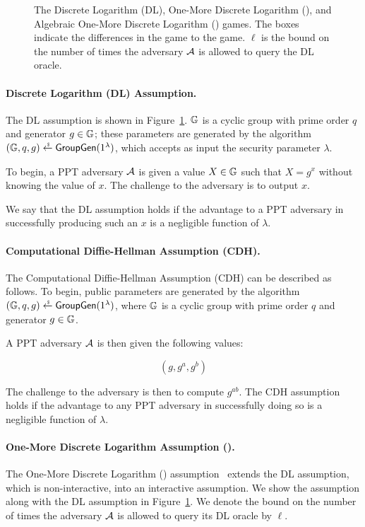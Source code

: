\begin{figure}[t]
\begin{pchstack}[boxed,center,space=1em]
\end{pchstack}
    \caption[The Discrete Logarithm (DL), One-More Discrete Logarithm (\OMDL), and Algebraic One-More Discrete Logarithm (\AOMDL) games.]
    {The Discrete Logarithm (DL), One-More Discrete Logarithm (\OMDL), and Algebraic One-More Discrete Logarithm (\AOMDL) games.
    The boxes indicate the differences in the \AOMDL game to the \OMDL game.
    $\ell$ is the bound on the number of times the adversary $\mathcal{A}$ is allowed to query the DL oracle.
    }
    \label{fig:dl-omdl}
\end{figure}

\paragraph{Discrete Logarithm (DL) Assumption.}
The DL assumption is shown in Figure~\ref{fig:dl-omdl}.
$\mathbb{G}$ is a cyclic group with prime order $q$ and generator $g \in \mathbb{G}$;
these parameters are generated by the algorithm $ (\Gr, q , g) \randpick \GroupGen(1^\usecp) $,
which accepts as input the security parameter $\lambda$.

To begin,
a PPT adversary $\mathcal{A}$ is given a value $X \in \mathbb{G}$ such that $X=g^x$ without knowing the value of $x$.
The challenge to the adversary is to output $x$.

We say that the DL assumption holds if the advantage to a PPT adversary in
successfully producing such an $x$ is a negligible function of $\lambda$.

\paragraph{Computational Diffie-Hellman Assumption (CDH).}
The Computational Diffie-Hellman Assumption (CDH) can be described as follows.
To begin,
public parameters are generated by the algorithm $ (\Gr, q , g) \randpick \GroupGen(1^\usecp) $,
where $\mathbb{G}$ is a cyclic group with prime order $q$ and generator $g \in \mathbb{G}$.

A PPT adversary $\mathcal{A}$ is then given the following values:

\[
  (g, g^a, g^b)
\]

The challenge to the adversary is then to compute $g^{ab}$.
The CDH assumption holds if the advantage to any PPT adversary in successfully
doing so is a negligible function of $\lambda$.

\paragraph{One-More Discrete Logarithm Assumption (\OMDL).}
The One-More Discrete Logarithm (\OMDL) assumption~\cite{BellareNPS03,BauerFP21} extends
the DL assumption, which is non-interactive, into an interactive assumption.
We show the \OMDL assumption along with the DL assumption in Figure~\ref{fig:dl-omdl}.
We denote the bound on the number of times the adversary $\mathcal{A}$ is allowed to query its DL oracle by $\ell$.

